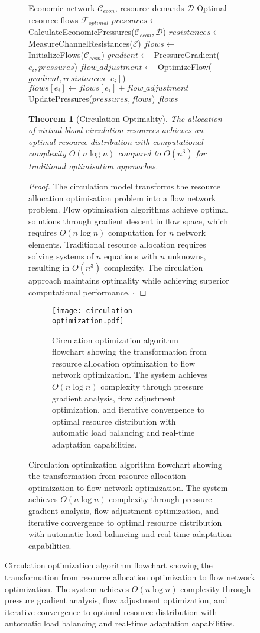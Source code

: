 \documentclass[12pt,a4paper]{article}
\newtheorem{theorem}{Theorem}
\begin{document}
\begin{figure}[H]
\begin{figure}[H]
\begin{algorithm}
\caption{Virtual Blood Circulation Resource Allocation}
\begin{algorithmic}[1]
\Require Economic network $\mathcal{C}_{econ}$, resource demands $\mathcal{D}$
\Ensure Optimal resource flows $\mathcal{F}_{optimal}$
\State $pressures \leftarrow$ CalculateEconomicPressures($\mathcal{C}_{econ}, \mathcal{D}$)
\State $resistances \leftarrow$ MeasureChannelResistances($\mathcal{E}$)
\State $flows \leftarrow$ InitializeFlows($\mathcal{C}_{econ}$)
        \State $gradient \leftarrow$ PressureGradient($e_i, pressures$)
        \State $flow\_adjustment \leftarrow$ OptimizeFlow($gradient, resistances[e_i]$)
        \State $flows[e_i] \leftarrow flows[e_i] + flow\_adjustment$
    \EndFor
    \State UpdatePressures($pressures, flows$)
\EndWhile
\Return $flows$
\end{algorithmic}
\end{algorithm}

\begin{theorem}[Circulation Optimality]
The allocation of virtual blood circulation resources achieves an optimal resource distribution with computational complexity $O(n \log n)$ compared to $O(n^3)$ for traditional optimisation approaches.
\end{theorem}

\begin{proof}
The circulation model transforms the resource allocation optimisation problem into a flow network problem. Flow optimisation algorithms achieve optimal solutions through gradient descent in flow space, which requires $O(n \log n)$ computation for $n$ network elements. Traditional resource allocation requires solving systems of $n$ equations with $n$ unknowns, resulting in $O(n^3)$ complexity. The circulation approach maintains optimality while achieving superior computational performance. $\square$
\end{proof}

\begin{figure}[H]
\centering
\texttt{[image: circulation-optimization.pdf]}
\caption{Circulation optimization algorithm flowchart showing the transformation from resource allocation optimization to flow network optimization. The system achieves $O(n \log n)$ complexity through pressure gradient analysis, flow adjustment optimization, and iterative convergence to optimal resource distribution with automatic load balancing and real-time adaptation capabilities.}
\label{fig:circulation-optimization}
\end{figure}


\end{figure}
\end{figure}
\end{document}
